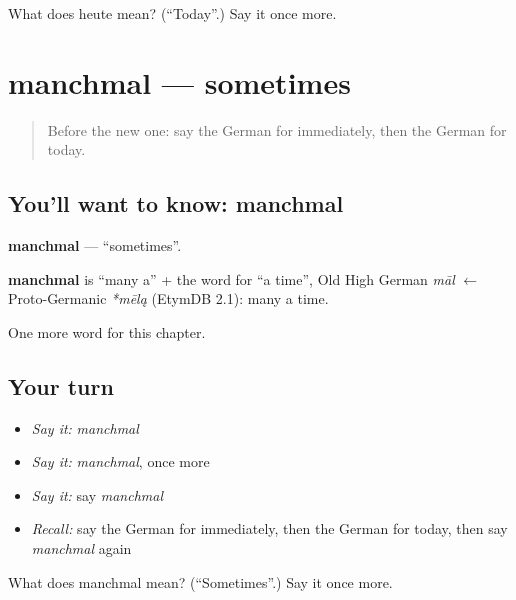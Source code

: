 \begin{tcolorbox}[breakable,colback=teal!4,colframe=teal!35!black,title={Before you move on}]
What does heute mean? (\textquotedblleft{}Today\textquotedblright{}.) Say it once more.
\end{tcolorbox}
\section[manchmal]{manchmal — sometimes}

\label{lesson:GE-C95-manchmal}



\begin{quote}
Before the new one: say the German for immediately, then the German for today.
\end{quote}

\subsection*{You'll want to know: manchmal}
\textbf{manchmal} — \textquotedblleft{}sometimes\textquotedblright{}.

\begin{cousinweb}
\textbf{manchmal} is \textquotedblleft{}many a\textquotedblright{} + the word for \textquotedblleft{}a time\textquotedblright{}, Old High German \emph{māl} $\leftarrow$ Proto-Germanic \emph{*mēlą} (EtymDB 2.1): many a time.
\end{cousinweb}

\begin{grammarlens}[title={What you've built}]
One more word for this chapter.
\end{grammarlens}

\subsection*{Your turn}
\begin{itemize}
\raggedright
  \item \emph{Say it:} \emph{manchmal}
  \item \emph{Say it:} \emph{manchmal}, once more
  \item \emph{Say it:} say \emph{manchmal}
  \item \emph{Recall:} say the German for immediately, then the German for today, then say \emph{manchmal} again
\end{itemize}

\begin{tcolorbox}[breakable,colback=teal!4,colframe=teal!35!black,title={Before you move on}]
What does manchmal mean? (\textquotedblleft{}Sometimes\textquotedblright{}.) Say it once more.
\end{tcolorbox}
